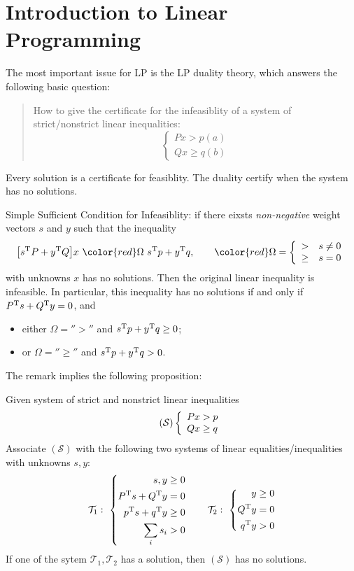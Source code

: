 \section{Introduction to Linear Programming}
The most important issue for LP is the LP duality theory, which answers the following basic question:
\begin{quotation}
How to give the certificate for the infeasiblity of a system of strict/nonstrict linear inequalities:
\[
\left\{
\begin{array}{l}
Px>p (a)\\
Qx\ge q (b)
\end{array}
\right.
\]
\end{quotation}
Every solution is a certificate for feasiblity.
The duality certify when the system has no solutions.
\begin{remark}
Simple Sufficient Condition for Infeasiblity:
if there eixsts \emph{non-negative} weight vectors $s$ and $y$ such that the inequality
\[
\big[
s\trans P + y\trans Q
\big]x~
{\color{red}\Omega}~
s\trans p + y\trans q,\qquad
{\color{red}\Omega}=\left\{
\begin{array}{ll}
>& s\ne0\\
\ge& s=0
\end{array}
\right.
\]
with unknowns $x$ has no solutions.
Then the original linear inequality is infeasible.
In particular, this inequality has no solutions if and only if $P^{\mathrm T} s + Q^{\mathrm T} y=0$, and
\begin{itemize}
\item
either $\Omega=''>''$ and $s^{\mathrm T} p + y^{\mathrm T} q\ge0$;
\item
or $\Omega=''\ge''$ and $s^{\mathrm T} p + y^{\mathrm T} q>0$.
\end{itemize}
\end{remark}
The remark implies the following proposition:
\begin{proposition}\label{proposition:1:1}
Given system of strict and nonstrict linear inequalities
\begin{equation}
\tag{$\mathcal{S}$}
\left\{
\begin{array}{l}
Px>p\\
Qx\ge q
\end{array}
\right.
\end{equation}
Associate $(\mathcal{S})$ with the following two systems of linear equalities/inequalities with unknowns $s,y$:
\[
\mathcal{T}_1:~
\left\{
\begin{aligned}
s, y&\ge0\\
P^{\mathrm T} s + Q^{\mathrm T} y&=0\\
p^{\mathrm T} s + q^{\mathrm T} y&\ge0\\
\sum_is_i&>0
\end{aligned}
\right.\qquad
\mathcal{T}_2:~
\left\{
\begin{aligned}
y&\ge0\\
Q^{\mathrm T} y&=0\\
q^{\mathrm T} y&>0
\end{aligned}
\right.
\]
If one of the sytem $\mathcal{T}_1,\mathcal{T}_2$ has a solution, then $(\mathcal{S})$ has no solutions.
\end{proposition}


